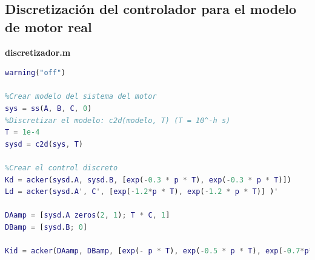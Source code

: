 \documentclass[a4paper, 12pt]{article}
\begin{document}
\subsection*{Discretización del controlador para el modelo de motor real}
\textbf{discretizador.m}
\begin{lstlisting}[language = Matlab]
warning("off")

%Crear modelo del sistema del motor
sys = ss(A, B, C, 0)
%Discretizar el modelo: c2d(modelo, T) (T = 10^-h s)
T = 1e-4
sysd = c2d(sys, T)

%Crear el control discreto
Kd = acker(sysd.A, sysd.B, [exp(-0.3 * p * T), exp(-0.3 * p * T)])
Ld = acker(sysd.A', C', [exp(-1.2*p * T), exp(-1.2 * p * T)] )'

DAamp = [sysd.A zeros(2, 1); T * C, 1] 
DBamp = [sysd.B; 0]

Kid = acker(DAamp, DBamp, [exp(- p * T), exp(-0.5 * p * T), exp(-0.7*p*T)])
\end{lstlisting}
\end{document}
